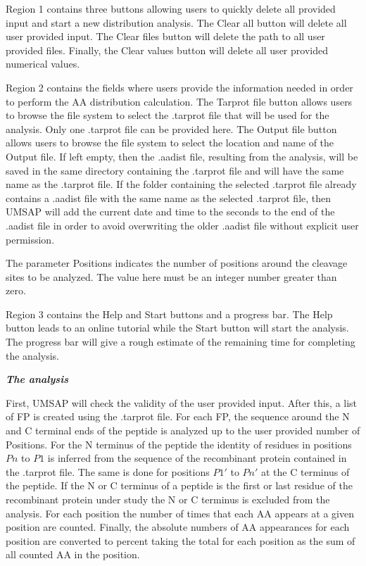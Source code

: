 Region \num{1} contains three buttons allowing users to quickly delete all provided input and start a new distribution analysis. The Clear all button will delete all user provided input. The Clear files button will delete the path to all user provided files. Finally, the Clear values button will delete all user provided numerical values.

Region \num{2} contains the fields where users provide the information needed in order to perform the AA distribution calculation. The Tarprot file button allows users to browse the file system to select the .tarprot file that will be used for the analysis. Only one .tarprot file can be provided here. The Output file button allows users to browse the file system to select the location and name of the Output file. If left empty, then the .aadist file, resulting from the analysis, will be saved in the same directory containing the .tarprot file and will have the same name as the .tarprot file. If the folder containing the selected .tarprot file already contains a .aadist file with the same name as the selected .tarprot file, then UMSAP will add the current date and time to the seconds to the end of the .aadist file in order to avoid overwriting the older .aadist file without explicit user permission.    

The parameter Positions indicates the number of positions around the cleavage sites to be analyzed. The value here must be an integer number greater than zero.

Region \num{3} contains the Help and Start buttons and a progress bar. The Help button leads to an online tutorial while the Start button will start the analysis. The progress bar will give a rough estimate of the remaining time for completing the analysis.
\newpage

\textit{\textbf{The analysis}}

First, UMSAP will check the validity of the user provided input. After this, a list of FP is created using the .tarprot file. For each FP, the sequence around the N and C terminal ends of the peptide is analyzed up to the user provided number of Positions. For the N terminus of the peptide the identity of residues in positions \(Pn\) to \(P1\) is inferred from the sequence of the recombinant protein contained in the .tarprot file. The same is done for positions \(P1'\) to \(Pn'\) at the C terminus of the peptide. If the N or C terminus of a peptide is the first or last residue of the recombinant protein under study the N or C terminus is excluded from the analysis. For each position the number of times that each AA appears at a given position are counted. Finally, the absolute numbers of AA appearances for each position are converted to percent taking the total for each position as the sum of all counted AA in the position.

